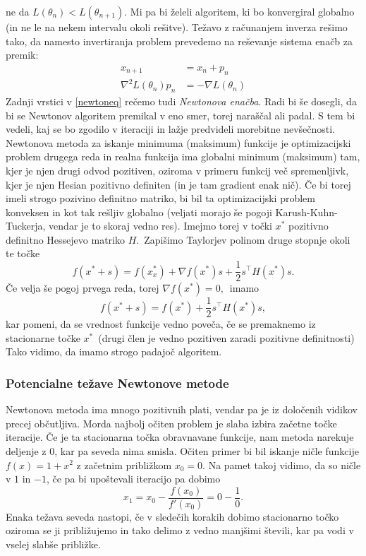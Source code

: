 \documentclass[12pt,a4paper]{amsart}
\theoremstyle{definition} %
\theoremstyle{plain} %
\begin{document}
ne da $L(\theta_{n}) < L(\theta_{n+1}).$ Mi pa bi želeli algoritem, ki bo konvergiral globalno (in ne le na nekem intervalu okoli rešitve).
Težavo z računanjem inverza rešimo tako, da namesto invertiranja problem prevedemo na reševanje sistema enačb za premik:
\begin{align}\label{newtoneq}
    x_{n + 1} &= x_{n} + p_{n} \nonumber\\
    \nabla^2L(\theta_{n})p_{n} &= -\nabla L(\theta_{n})
\end{align}
Zadnji vrstici v \eqref{newtoneq} rečemo tudi \textit{Newtonova enačba}.
Radi bi še dosegli, da bi se Newtonov algoritem premikal v eno smer, torej naraščal ali padal. S tem bi vedeli, kaj se bo zgodilo v iteraciji in lažje predvideli morebitne
nevšečnosti. Newtonova metoda za iskanje minimuma (maksimum) funkcije je optimizacijski problem drugega reda in realna funkcija ima globalni minimum (maksimum) tam, kjer je
njen drugi odvod pozitiven, oziroma v primeru funkcij več spremenljivk, kjer je njen Hesian pozitivno definiten (in je tam gradient enak nič). Če bi torej imeli
strogo pozivino definitno matriko, bi bil ta optimizacijski problem konveksen in kot tak rešljiv globalno (veljati morajo še pogoji Karush-Kuhn-Tuckerja, vendar je to skoraj vedno res).
Imejmo torej v točki $x^{*}$ pozitivno definitno Hessejevo matriko $H.$~Zapišimo Taylorjev polinom druge stopnje okoli te točke
\[
    f(x^{*} + s) = f(x_x^{*}) + \nabla f(x^{*})s + \frac{1}{2}s^\top H(x^{*})s.
\]
Če velja še pogoj prvega reda, torej $\nabla f(x^{*}) = 0,$~imamo
\[
    f(x^{*} + s) = f(x^{*}) + \frac{1}{2}s^\top H(x^{*})s,
\]
kar pomeni, da se vrednost funkcije vedno poveča, če se premaknemo iz stacionarne točke $x^{*}$~(drugi člen je vedno pozitiven zaradi pozitivne definitnosti)
Tako vidimo, da imamo strogo padajoč algoritem.

\subsubsection{Potencialne težave Newtonove metode}
Newtonova metoda ima mnogo pozitivnih plati, vendar pa je iz določenih vidikov precej občutljiva. Morda najbolj očiten problem je slaba izbira začetne točke iteracije. Če je ta
stacionarna točka obravnavane funkcije, nam metoda narekuje deljenje z 0, kar pa seveda nima smisla. Očiten primer bi bil iskanje ničle funkcije $f(x) = 1+x^2$ z začetnim približkom $x_{0} = 0.$
Na pamet takoj vidimo, da so ničle v $1$ in $-1$, če pa bi upoštevali iteracijo pa dobimo
\[
    x_{1} = x_{0} - \frac{f(x_{0})}{f'(x_{0})} = 0 - \frac{1}{0}.   
\]
Enaka težava seveda nastopi, če v sledečih korakih dobimo stacionarno točko oziroma se ji približujemo in tako delimo z vedno manjšimi števili, kar pa vodi v vselej slabše približke.
\end{document}
